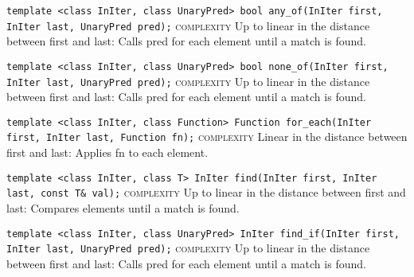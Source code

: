 \noindent{}\hspace*{0.25em}\lstinline[basicstyle=\ttfamily\color{corange}]{template <class InIter, class UnaryPred> bool any_of(InIter first, InIter last, UnaryPred pred);} \textsc{complexity} Up to linear in the distance between first and last: Calls pred for each element until a match is found.\\\vspace{-0.6em}

\noindent{}\hspace*{0.25em}\lstinline[basicstyle=\ttfamily\color{corange}]{template <class InIter, class UnaryPred> bool none_of(InIter first, InIter last, UnaryPred pred);} \textsc{complexity} Up to linear in the distance between first and last: Calls pred for each element until a match is found.\\\vspace{-0.6em}

\noindent{}\hspace*{0.25em}\lstinline[basicstyle=\ttfamily\color{corange}]{template <class InIter, class Function> Function for_each(InIter first, InIter last, Function fn);} \textsc{complexity} Linear in the distance between first and last: Applies fn to each element.\\\vspace{-0.6em}

\noindent{}\hspace*{0.25em}\lstinline[basicstyle=\ttfamily\color{corange}]{template <class InIter, class T> InIter find(InIter first, InIter last, const T& val);} \textsc{complexity} Up to linear in the distance between first and last: Compares elements until a match is found.\\\vspace{-0.6em}

\noindent{}\hspace*{0.25em}\lstinline[basicstyle=\ttfamily\color{corange}]{template <class InIter, class UnaryPred> InIter find_if(InIter first, InIter last, UnaryPred pred);} \textsc{complexity} Up to linear in the distance between first and last: Calls pred for each element until a match is found.\\\vspace{-0.6em}

